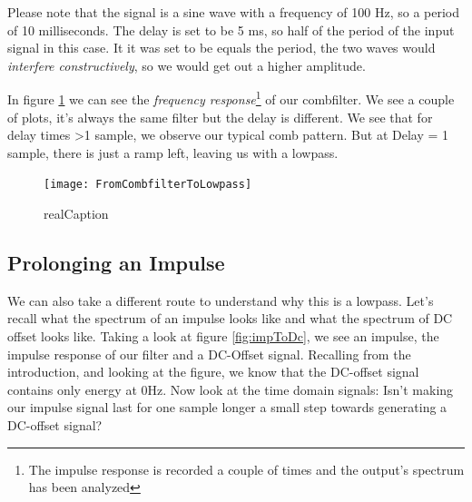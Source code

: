 Please note that the signal is a sine wave with a frequency of 100 Hz, so a period of 10 milliseconds. The delay is set to be 5 ms, so half of the period of the input signal in this case. It it was set to be equals the period, the two waves would \textit{interfere constructively}, so we would get out a higher amplitude. \\


In figure \ref{fig:combToLowpass} we can see the \textit{frequency response}\footnote{The impulse response is recorded a couple of times and the output's spectrum has been analyzed} of our combfilter. We see a couple of plots, it's always the same filter but the delay is different. We see that for delay times >1 sample, we observe our typical comb pattern. But at Delay = 1 sample, there is just a ramp left, leaving us with a lowpass.

\begin{figure}[H]
	\centering
	\texttt{[image: FromCombfilterToLowpass]}
	\caption[shortCaption]
	{realCaption}
	\label{fig:combToLowpass}
\end{figure}



\subsection{Prolonging an Impulse}
We can also take a different route to understand why this is a lowpass. Let's recall what the spectrum of an impulse looks like and what the spectrum of DC offset looks like. Taking a look at figure \ref{fig:impToDc}, we see an impulse, the impulse response of our filter and a DC-Offset signal. Recalling from the introduction, and looking at the figure, we know that the DC-offset signal contains only energy at 0Hz. Now look at the time domain signals: Isn't making our impulse signal last for one sample longer a small step towards generating a DC-offset signal?

